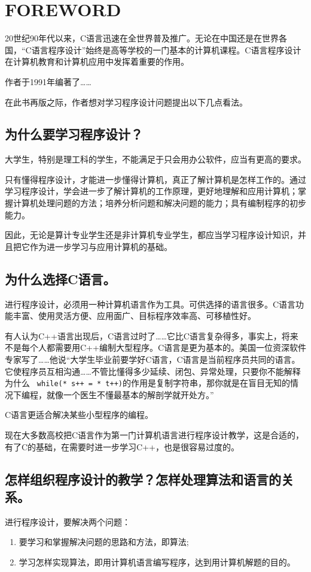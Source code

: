 \chapter{FOREWORD}
20世纪90年代以来，C语言迅速在全世界普及推广。无论在中国还是在世界各国，“C语言程序设计”始终是高等学校的一门基本的计算机课程。C语言程序设计在计算机教育和计算机应用中发挥着重要的作用。

作者于1991年编著了……

在此书再版之际，作者想对学习程序设计问题提出以下几点看法。
\section{为什么要学习程序设计？}
大学生，特别是理工科的学生，不能满足于只会用办公软件，应当有更高的要求。

只有懂得程序设计，才能进一步懂得计算机，真正了解计算机是怎样工作的。通过学习程序设计，学会进一步了解计算机的工作原理，更好地理解和应用计算机；掌握计算机处理问题的方法；培养分析问题和解决问题的能力；具有编制程序的初步能力。

因此，无论是算计专业学生还是非计算机专业学生，都应当学习程序设计知识，并且把它作为进一步学习与应用计算机的基础。
\section{为什么选择C语言。}

进行程序设计，必须用一种计算机语言作为工具。可供选择的语言很多。C语言功能丰富、使用灵活方便、应用面广、目标程序效率高、可移植性好。

有人认为C++语言出现后，C语言过时了……它比C语言复杂得多，事实上，将来不是每个人都需要用C++编制大型程序。C语言是更为基本的。美国一位资深软件专家写了……他说“大学生毕业前要学好C语言，C语言是当前程序员共同的语言。它使程序员互相沟通……不管比懂得多少延续、闭包、异常处理，只要你不能解释为什么 \verb| while(* s++ = * t++)|的作用是复制字符串，那你就是在盲目无知的情况下编程，就像一个医生不懂最基本的解剖学就开处方。”

C语言更适合解决某些小型程序的编程。

现在大多数高校把C语言作为第一门计算机语言进行程序设计教学，这是合适的，有了C的基础，在需要时进一步学习C++，也是很容易过度的。
\section{怎样组织程序设计的教学？怎样处理算法和语言的关系。}
进行程序设计，要解决两个问题：
	\begin{enumerate}
		\item 要学习和掌握解决问题的思路和方法，即算法;
		\item 学习怎样实现算法，即用计算机语言编写程序，达到用计算机解题的目的。
	\end{enumerate}

